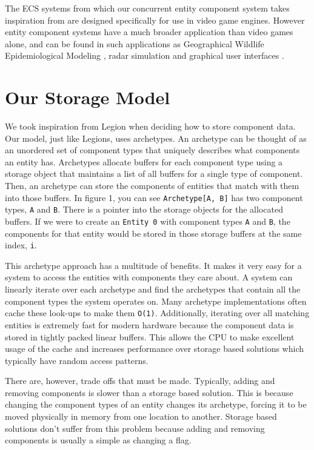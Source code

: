 \documentclass[conference]{IEEEtran}
\begin{document}
The ECS systems from which our concurrent entity component system takes inspiration from are designed specifically for use in video game engines. However entity component systems have a much broader application than video games alone, and can be found in such applications as Geographical Wildlife Epidemiological Modeling \cite{https://doi.org/10.1111/gean.12258}, radar simulation \cite{radar_ECS} and graphical user interfaces \cite{10.1145/3331150}.

\section{Our Storage Model}

We took inspiration from Legion when deciding how to store component data. Our model, just like Legions, uses archetypes. An archetype can be thought of as an unordered set of component types that uniquely describes what components an entity has. Archetypes allocate buffers for each component type using a storage object that maintains a list of all buffers for a single type of component. Then, an archetype can store the components of entities that match with them into those buffers. In figure 1, you can see \verb|Archetype[A, B]| has two component types, \verb|A| and \verb|B|. There is a pointer into the storage objects for the allocated buffers. If we were to create an \verb|Entity 0| with component types \verb|A| and \verb|B|, the components for that entity would be stored in those storage buffers at the same index, \verb|i|. 

This archetype approach has a multitude of benefits. It makes it very easy for a system to access the entities with components they care about. A system can linearly iterate over each archetype and find the archetypes that contain all the component types the system operates on. Many archetype implementations often cache these look-ups to make them \verb|O(1)|. Additionally, iterating over all matching entities is extremely fast for modern hardware because the component data is stored in tightly packed linear buffers. This allows the CPU to make excellent usage of the cache and increases performance over storage based solutions which typically have random access patterns.

There are, however, trade offs that must be made. Typically, adding and removing components is slower than a storage based solution. This is because changing the component types of an entity changes its archetype, forcing it to be moved physically in memory from one location to another. Storage based solutions don't suffer from this problem because adding and removing components is usually a simple as changing a flag. 
\end{document}
